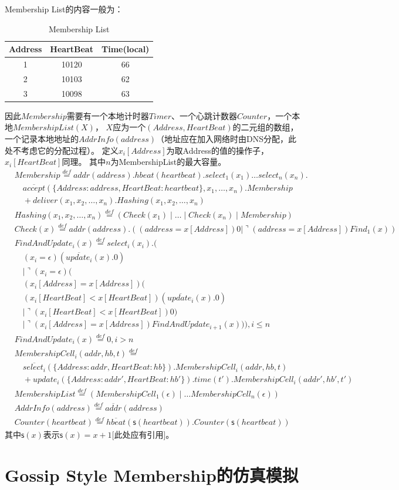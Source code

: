 Membership List的内容一般为：
\begin{table}[!hpt]
    \caption[Membership List]{Membership List\footnotemark}
    \label{tab:firstone}
    \centering
    \begin{tabular}{@{}ccc@{}} \toprule
      Address & HeartBeat & Time(local) \\ \midrule
      1 & 10120 & 66\\
      2 & 10103 & 62\\
      3 & 10098 & 63\\ \bottomrule
    \end{tabular}
  \end{table}
因此$Membership$需要有一个本地计时器$Timer$、一个心跳计数器$Counter$，一个本地$MembershipList(X)$，
$X$应为一个$(Address, HeartBeat)$的二元组的数组，一个记录本地地址的$AddrInfo(address)$（地址应在加入网络时由DNS分配，此处不考虑它的分配过程）。
定义$x_i[Address]$为取Address的值的操作子，$x_i[HeartBeat]$同理。
其中$n$为MembershipList的最大容量。
\begin{align*}
    &Membership\stackrel{def}{=}addr(address).hbeat(heartbeat).select_1(x_1)\dots select_n(x_n).\\
    &\quad\overline{accept}(\{Address:address,HeartBeat:heartbeat\},x_1,\dots,x_n).Membership\\
    &\quad+deliver(x_1,x_2,\dots,x_n).Hashing(x_1,x_2,\dots,x_n)\\
    &Hashing(x_1,x_2,\dots,x_n)\stackrel{def}{=}(Check(x_1)\mid  \dots \mid Check(x_n) \mid Membership)\\
    &Check(x)\stackrel{def}{=}addr(address).((address=x[Address])0|\urcorner(address=x[Address])Find_1(x))\\
    &FindAndUpdate_i(x)\stackrel{def}{=}select_i(x_i).(\\
    &\quad(x_i = \epsilon) (\overline{update_i}(x).0)\\
    &\quad| \urcorner(x_i = \epsilon)(\\
    &\quad(x_i[Address]=x[Address])(\\
    &\quad(x_i[HeartBeat]<x[HeartBeat])(\overline{update_i}(x).0)\\
    &\quad\mid \urcorner (x_i[HeartBeat]<x[HeartBeat])0)\\
    &\quad\mid \urcorner (x_i[Address]=x[Address])FindAndUpdate_{i+1}(x))),i\leq n\\
    &FindAndUpdate_i(x)\stackrel{def}{=}0,i>n\\
    &MembershipCell_i(addr,hb,t)\stackrel{def}{=}\\
    &\quad\overline{select_i}(\{Address:addr,HeartBeat:hb\}).MembershipCell_i(addr,hb,t)\\
    &\quad+update_i(\{Address:addr',HeartBeat:hb'\}).time(t').MembershipCell_i(addr',hb',t')\\
    &MembershipList\stackrel{def}{=}(MembershipCell_1(\epsilon)\mid \dots MembershipCell_n(\epsilon))\\
    &AddrInfo(address)\stackrel{def}{=}\overline{addr}(address)\\
    &Counter(heartbeat)\stackrel{def}{=}\overline{hbeat}(\mathsf{s}(heartbeat)).Counter(\mathsf{s}(heartbeat))
\end{align*}
其中$\mathsf{s}(x)$表示$\mathsf{s}(x)=x+1$[此处应有引用]。
\section{Gossip Style Membership的仿真模拟}